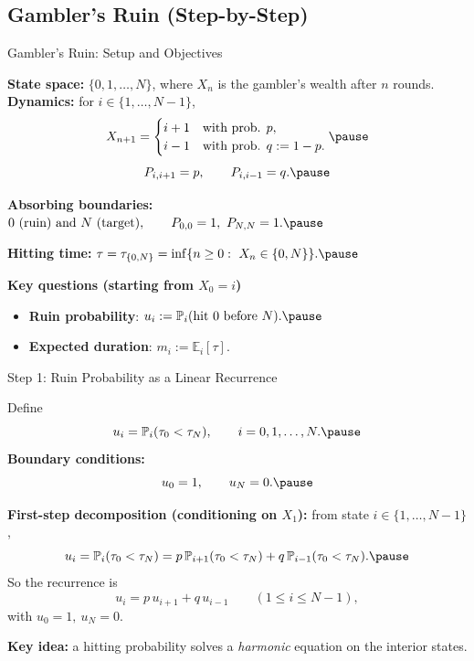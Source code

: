 \documentclass[aspectratio=169]{beamer}
\begin{document}
\subsection{Gambler's Ruin (Step-by-Step)}

\begin{frame}{Gambler's Ruin: Setup and Objectives}

\textbf{State space:} $\{0,1,\dots,N\}$, where $X_n$ is the gambler's wealth after $n$ rounds.
\pause
\medskip
\textbf{Dynamics:} for $i\in\{1,\dots,N-1\}$,
\[
X_{n+1}=
\begin{cases}
i+1 & \text{with prob. } p,\\
i-1 & \text{with prob. } q:=1-p.
\end{cases}\pause
\]
\[
P_{i,i+1}=p,\qquad P_{i,i-1}=q.
\vspace{-2mm}\pause
\]

\textbf{Absorbing boundaries:}
$
0 \text{ (ruin) and } N \text{ (target)},\qquad P_{0,0}=1,\ P_{N,N}=1.\pause
$

\textbf{Hitting time:}
$
\tau=\tau_{\{0,N\}}=\inf\{n\ge 0:\ X_n\in\{0,N\}\}.\pause
$

\medskip
\textbf{Key questions (starting from $X_0=i$)}
\begin{itemize}
  \item \textbf{Ruin probability}:
  $
  u_i:=\mathbb{P}_i(\text{hit }0\text{ before }N).\pause
  $
  \item \textbf{Expected duration}:
  $
  m_i:=\mathbb{E}_i[\tau].
  $
\end{itemize}
 \end{frame}

\begin{frame}{Step 1: Ruin Probability as a Linear Recurrence}

Define
\[
u_i=\mathbb{P}_i(\tau_0<\tau_N),
\qquad i=0,1,\dots,N.\pause
\]
\textbf{Boundary conditions:}
\[
u_0=1,\qquad u_N=0.\pause
\]

\medskip
\textbf{First-step decomposition (conditioning on $X_1$):}
from state $i\in\{1,\dots,N-1\}$,
\[
u_i
= \mathbb{P}_i(\tau_0<\tau_N)
= p\,\mathbb{P}_{i+1}(\tau_0<\tau_N)+q\,\mathbb{P}_{i-1}(\tau_0<\tau_N).\pause
\]
So the recurrence is
\[
\boxed{u_i = p\,u_{i+1}+q\,u_{i-1}\qquad (1\le i\le N-1),}
\]
with $u_0=1,\ u_N=0$.\pause

\medskip
\textbf{Key idea:} a hitting probability solves a \emph{harmonic} equation on the interior states.

\end{frame}
\end{document}
